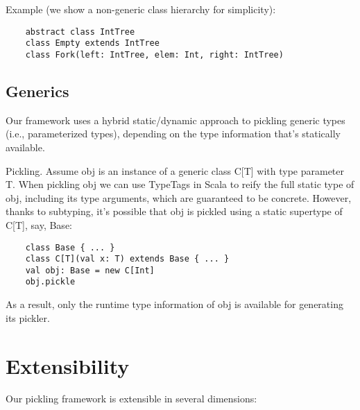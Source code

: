 \documentclass[preprint,10pt]{sigplanconf}
\theoremstyle{definition}
\begin{document}
Example (we show a non-generic class hierarchy for simplicity):

\begin{verbatim}
    abstract class IntTree
    class Empty extends IntTree
    class Fork(left: IntTree, elem: Int, right: IntTree)
\end{verbatim}

\subsection{Generics}

Our framework uses a hybrid static/dynamic approach to pickling generic types (i.e., parameterized types), depending on the type information that's statically available.

Pickling. Assume obj is an instance of a generic class C[T] with type parameter T. When pickling obj we can use TypeTags in Scala to reify the full static type of obj, including its type arguments, which are guaranteed to be concrete. However, thanks to subtyping, it's possible that obj is pickled using a static supertype of C[T], say, Base:

\begin{verbatim}
    class Base { ... }
    class C[T](val x: T) extends Base { ... }
    val obj: Base = new C[Int]
    obj.pickle
\end{verbatim}

As a result, only the runtime type information of obj is available for generating its pickler.



\section{Extensibility}

Our pickling framework is extensible in several dimensions:
\end{document}
